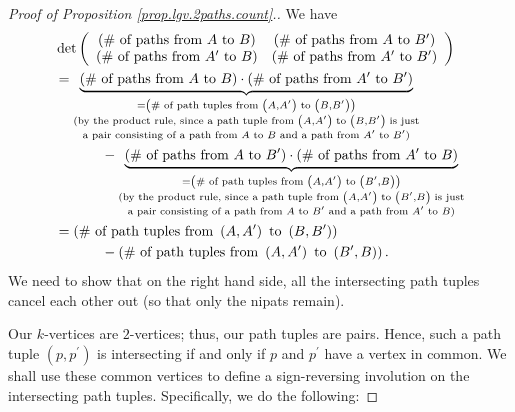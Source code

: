 \begin{definition}
\begin{proof}
[Proof of Proposition \ref{prop.lgv.2paths.count}.]We have%
\begin{align}
&  \det\left(
\begin{array}
[c]{cc}%
\left(  \text{\# of paths from }A\text{ to }B\right)  & \left(  \text{\# of
paths from }A\text{ to }B^{\prime}\right) \\
\left(  \text{\# of paths from }A^{\prime}\text{ to }B\right)  & \left(
\text{\# of paths from }A^{\prime}\text{ to }B^{\prime}\right)
\end{array}
\right) \nonumber\\
&  =\underbrace{\left(  \text{\# of paths from }A\text{ to }B\right)
\cdot\left(  \text{\# of paths from }A^{\prime}\text{ to }B^{\prime}\right)
}_{\substack{=\left(  \text{\# of path tuples from }\left(  A,A^{\prime
}\right)  \text{ to }\left(  B,B^{\prime}\right)  \right)  \\\text{(by the
product rule, since a path tuple from }\left(  A,A^{\prime}\right)  \text{ to
}\left(  B,B^{\prime}\right)  \text{ is just}\\\text{a pair consisting of a
path from }A\text{ to }B\text{ and a path from }A^{\prime}\text{ to }%
B^{\prime}\text{)}}}\nonumber\\
&  \ \ \ \ \ \ \ \ \ \ -\underbrace{\left(  \text{\# of paths from }A\text{ to
}B^{\prime}\right)  \cdot\left(  \text{\# of paths from }A^{\prime}\text{ to
}B\right)  }_{\substack{=\left(  \text{\# of path tuples from }\left(
A,A^{\prime}\right)  \text{ to }\left(  B^{\prime},B\right)  \right)
\\\text{(by the product rule, since a path tuple from }\left(  A,A^{\prime
}\right)  \text{ to }\left(  B^{\prime},B\right)  \text{ is just}\\\text{a
pair consisting of a path from }A\text{ to }B^{\prime}\text{ and a path from
}A^{\prime}\text{ to }B\text{)}}}\nonumber\\
&  =\left(  \text{\# of path tuples from }\left(  A,A^{\prime}\right)  \text{
to }\left(  B,B^{\prime}\right)  \right) \nonumber\\
&  \ \ \ \ \ \ \ \ \ \ -\left(  \text{\# of path tuples from }\left(
A,A^{\prime}\right)  \text{ to }\left(  B^{\prime},B\right)  \right)  .
\label{pf.prop.lgv.2paths.count.1}%
\end{align}
We need to show that on the right hand side, all the intersecting path tuples
cancel each other out (so that only the nipats remain).

Our $k$-vertices are $2$-vertices; thus, our path tuples are pairs. Hence,
such a path tuple $\left(  p,p^{\prime}\right)  $ is intersecting if and only
if $p$ and $p^{\prime}$ have a vertex in common. We shall use these common
vertices to define a sign-reversing involution on the intersecting path
tuples. Specifically, we do the following:


\end{proof}
\end{definition}

